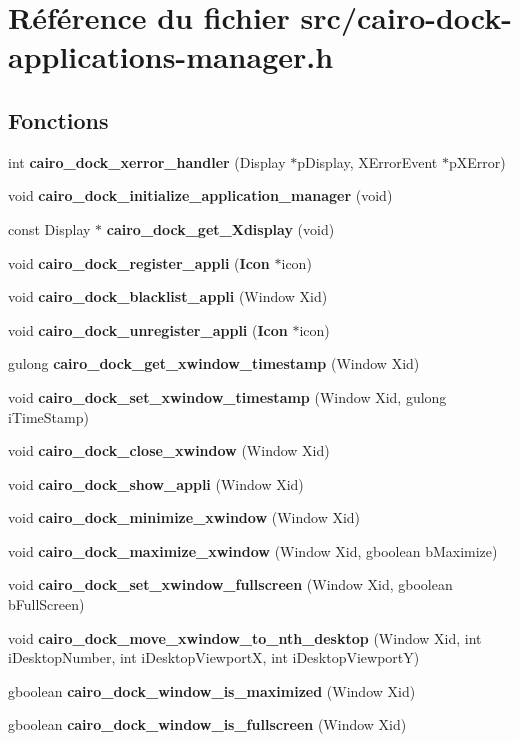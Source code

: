 \section{Référence du fichier src/cairo-dock-applications-manager.h}
\label{cairo-dock-applications-manager_8h}
\subsection*{Fonctions}
\begin{CompactItemize}
\item 
int {\bf cairo\_\-dock\_\-xerror\_\-handler} (Display $\ast$pDisplay, XErrorEvent $\ast$pXError)
\item 
void {\bf cairo\_\-dock\_\-initialize\_\-application\_\-manager} (void)
\item 
const Display $\ast$ {\bf cairo\_\-dock\_\-get\_\-Xdisplay} (void)
\item 
void {\bf cairo\_\-dock\_\-register\_\-appli} ({\bf Icon} $\ast$icon)
\item 
void {\bf cairo\_\-dock\_\-blacklist\_\-appli} (Window Xid)
\item 
void {\bf cairo\_\-dock\_\-unregister\_\-appli} ({\bf Icon} $\ast$icon)
\item 
gulong {\bf cairo\_\-dock\_\-get\_\-xwindow\_\-timestamp} (Window Xid)
\item 
void {\bf cairo\_\-dock\_\-set\_\-xwindow\_\-timestamp} (Window Xid, gulong iTimeStamp)
\item 
void {\bf cairo\_\-dock\_\-close\_\-xwindow} (Window Xid)
\item 
void {\bf cairo\_\-dock\_\-show\_\-appli} (Window Xid)
\item 
void {\bf cairo\_\-dock\_\-minimize\_\-xwindow} (Window Xid)
\item 
void {\bf cairo\_\-dock\_\-maximize\_\-xwindow} (Window Xid, gboolean bMaximize)
\item 
void {\bf cairo\_\-dock\_\-set\_\-xwindow\_\-fullscreen} (Window Xid, gboolean bFullScreen)
\item 
void {\bf cairo\_\-dock\_\-move\_\-xwindow\_\-to\_\-nth\_\-desktop} (Window Xid, int iDesktopNumber, int iDesktopViewportX, int iDesktopViewportY)
\item 
gboolean {\bf cairo\_\-dock\_\-window\_\-is\_\-maximized} (Window Xid)
\item 
gboolean {\bf cairo\_\-dock\_\-window\_\-is\_\-fullscreen} (Window Xid)
\item 

\end{CompactItemize}
